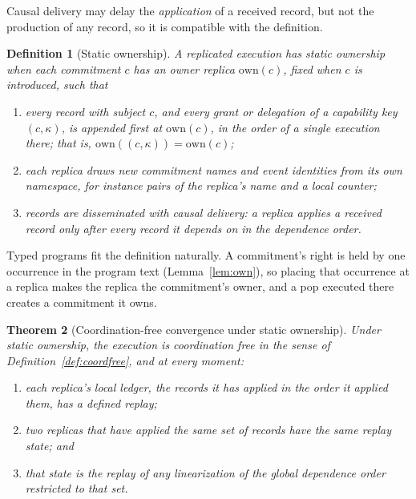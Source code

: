 \documentclass[11pt,openany]{book}
\newtheorem{theorem}{Theorem}[chapter]
\newtheorem{definition}[theorem]{Definition}
\theoremstyle{remark}
\begin{document}
Causal delivery may delay the \emph{application} of a received record,
but not the production of any record, so it is compatible with the
definition.

\begin{definition}[Static ownership]\label{def:ownership}
A replicated execution has \emph{static ownership} when each commitment
$c$ has an owner replica $\mathrm{own}(c)$, fixed when $c$ is introduced,
such that
\begin{enumerate}[label=(\roman*)]
\item every record with subject $c$, and every grant or delegation of a
capability key $(c,\kappa)$, is appended first at $\mathrm{own}(c)$, in
the order of a single execution there; that is,
$\mathrm{own}((c,\kappa))=\mathrm{own}(c)$;
\item each replica draws new commitment names and event identities from
its own namespace, for instance pairs of the replica's name and a local
counter;
\item records are disseminated with causal delivery: a replica applies a
received record only after every record it depends on in the dependence
order.
\end{enumerate}
\end{definition}

Typed programs fit the definition naturally. A commitment's right is
held by one occurrence in the program text (Lemma~\ref{lem:own}), so
placing that occurrence at a replica makes the replica the commitment's
owner, and a pop executed there creates a commitment it owns.

\begin{theorem}[Coordination-free convergence under static ownership]
\label{thm:coordfree}
Under static ownership, the execution is coordination free in the sense
of Definition~\ref{def:coordfree}, and at every moment:
\begin{enumerate}[label=(\alph*)]
\item each replica's local ledger, the records it has applied in the order
it applied them, has a defined replay;
\item two replicas that have applied the same set of records have the
same replay state; and
\item that state is the replay of any linearization of the global
dependence order restricted to that set.
\end{enumerate}
\end{theorem}
\end{document}
